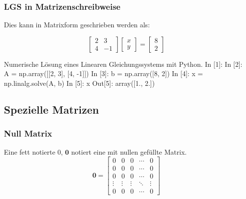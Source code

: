 \subsubsection{LGS in Matrizenschreibweise}


Dies kann in Matrixform geschrieben werden als:

\[
\begin{bmatrix} 2 & 3 \\ 4 & -1 \end{bmatrix}  
\begin{bmatrix} x \\ y \end{bmatrix}  
=
\begin{bmatrix} 8 \\ 2 \end{bmatrix}
\]





\begin{python}{Numerische Lösung eines Linearen Gleichungssystems mit Python.}
In [1]: %
In [2]: A = np.array([[2, 3], [4, -1]])
In [3]: b = np.array([8, 2])
In [4]: x = np.linalg.solve(A, b)
In [5]: x
Out[5]: array([1., 2.])
\end{python}








\subsection{Spezielle Matrizen}
 

\subsubsection*{Null Matrix}
Eine fett notierte 0, $\mathbf{0}$ notiert eine mit nullen gefüllte Matrix.
\begin{equation}
\mathbf{0} =
\begin{bmatrix}
0 & 0 & 0 & \cdots & 0 \\
0 & 0 & 0 & \cdots & 0 \\
0 & 0 & 0 & \cdots & 0 \\
\vdots & \vdots & \vdots & \ddots & \vdots \\
0 & 0 & 0 & \cdots & 0
\end{bmatrix}
\end{equation} 

